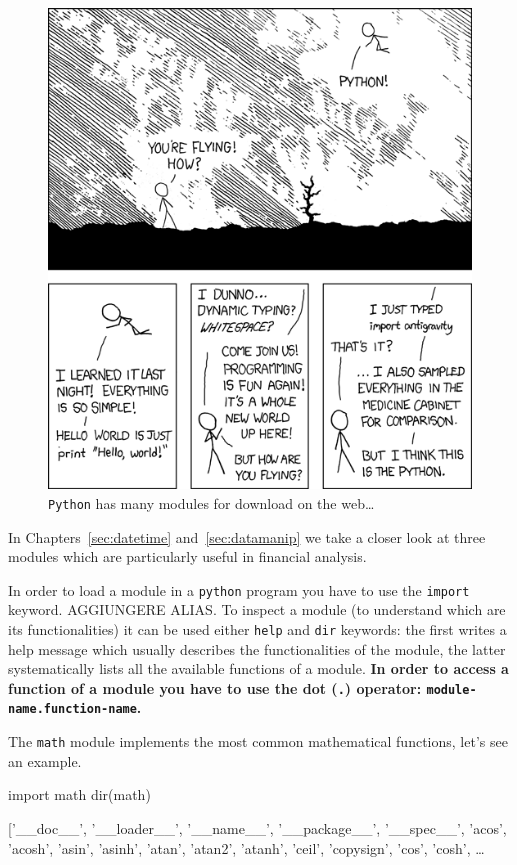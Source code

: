 \begin{figure}
\centering
\includegraphics[width=0.5\linewidth]{figures/python.png}
\caption{\texttt{Python} has many modules for download on the web\ldots}
\label{fig:fancy_module}
\end{figure}

In Chapters~\ref{sec:datetime} and~\ref{sec:datamanip} we take a closer look at three modules which are particularly useful in financial analysis.

In order to load a module in a \texttt{python} program you have to use the \texttt{import} keyword. AGGIUNGERE ALIAS. To inspect a module (to understand which are its functionalities) it can be used either \texttt{help} and \texttt{dir} keywords: the first writes a help message which usually describes the functionalities of the module, the latter systematically lists all the available functions of a module.
\textbf{In order to access a function of a module you have to use the dot (\texttt{.}) operator: \texttt{module-name.function-name}.}

The \texttt{math} module implements the most common mathematical functions, let's see an example. 

\begin{ipython}
import math
dir(math)
\end{ipython}
\begin{ioutput}
['\_\_doc\_\_',
 '\_\_loader\_\_',
 '\_\_name\_\_',
 '\_\_package\_\_',
 '\_\_spec\_\_',
 'acos',
 'acosh',
 'asin',
 'asinh',
 'atan',
 'atan2',
 'atanh',
 'ceil',
 'copysign',
 'cos',
 'cosh',
\ldots
\end{ioutput}

